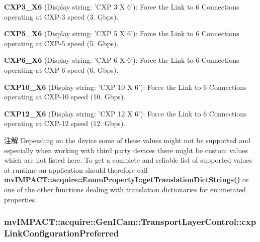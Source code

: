 \begin{DoxyItemize}
\item {\bfseries C\+X\+P3\+\_\+\+X6} (Display string\+: 'C\+X\+P 3 X 6')\+: Force the Link to 6 Connections operating at C\+X\+P-\/3 speed (3. Gbps).
\item {\bfseries C\+X\+P5\+\_\+\+X6} (Display string\+: 'C\+X\+P 5 X 6')\+: Force the Link to 6 Connections operating at C\+X\+P-\/5 speed (5. Gbps).
\item {\bfseries C\+X\+P6\+\_\+\+X6} (Display string\+: 'C\+X\+P 6 X 6')\+: Force the Link to 6 Connections operating at C\+X\+P-\/6 speed (6. Gbps).
\item {\bfseries C\+X\+P10\+\_\+\+X6} (Display string\+: 'C\+X\+P 10 X 6')\+: Force the Link to 6 Connections operating at C\+X\+P-\/10 speed (10. Gbps).
\item {\bfseries C\+X\+P12\+\_\+\+X6} (Display string\+: 'C\+X\+P 12 X 6')\+: Force the Link to 6 Connections operating at C\+X\+P-\/12 speed (12. Gbps).
\end{DoxyItemize}

\begin{DoxyNote}{注解}
Depending on the device some of these values might not be supported and especially when working with third party devices there might be custom values which are not listed here. To get a complete and reliable list of supported values at runtime an application should therefore call {\bfseries \hyperlink{classmv_i_m_p_a_c_t_1_1acquire_1_1_enum_property_i_a0ba6ccbf5ee69784d5d0b537924d26b6}{mv\+I\+M\+P\+A\+C\+T\+::acquire\+::\+Enum\+Property\+I\+::get\+Translation\+Dict\+Strings()}} or one of the other functions dealing with translation dictionaries for enumerated properties. 
\end{DoxyNote}
\hypertarget{classmv_i_m_p_a_c_t_1_1acquire_1_1_gen_i_cam_1_1_transport_layer_control_a54781c674406391ae8be27a26e528591}{
\subsubsection[{cxp\+Link\+Configuration\+Preferred}]{ mv\+I\+M\+P\+A\+C\+T\+::acquire\+::\+Gen\+I\+Cam\+::\+Transport\+Layer\+Control\+::cxp\+Link\+Configuration\+Preferred}}\label{classmv_i_m_p_a_c_t_1_1acquire_1_1_gen_i_cam_1_1_transport_layer_control_a54781c674406391ae8be27a26e528591}


